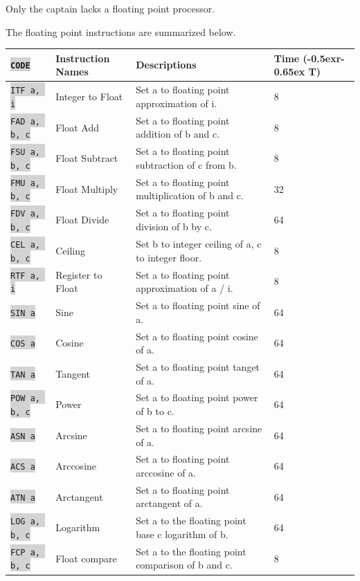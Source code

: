 \documentclass{article}
\newcommand{\vnscode}[1]{\colorbox{lightgray}{\lstinline[language=vns]{#1}}}
\newcommand{\RT}{\lower-0.5ex\hbox{r}\kern-0.65ex T}
\begin{document}
Only the captain lacks a floating point processor.

The floating point instructions are summarized below.

\begin{minipage}{\textwidth}
\label{table:float}
\centering
\begin{tabular}{llll}
    \hline \vnscode{CODE} & Instruction Names & Descriptions & Time (\RT) \\ \hline
    \vnscode{ITF a, i} & Integer to Float & Set a to floating point approximation of i. & 8 \\
    \vnscode{FAD a, b, c} & Float Add & Set a to floating point addition of b and c. & 8 \\
    \vnscode{FSU a, b, c} & Float Subtract & Set a to floating point subtraction of c from b. & 8 \\
    \vnscode{FMU a, b, c} & Float Multiply & Set a to floating point multiplication of b and c. & 32 \\
    \vnscode{FDV a, b, c} & Float Divide & Set a to floating point division of b by c. & 64 \\
    \vnscode{CEL a, b, c} & Ceiling & Set b to integer ceiling of a, c to integer floor. & 8 \\
    \vnscode{RTF a, i} & Register to Float & Set a to floating point approximation of a / i. & 8 \\
    \vnscode{SIN a} & Sine & Set a to floating point sine of a. & 64 \\
    \vnscode{COS a} & Cosine & Set a to floating point cosine of a. & 64 \\
    \vnscode{TAN a} & Tangent & Set a to floating point tanget of a. & 64 \\
    \vnscode{POW a, b, c} & Power & Set a to floating point power of b to c. & 64 \\
    \vnscode{ASN a} & Arcsine & Set a to floating point arcsine of a. & 64 \\
    \vnscode{ACS a} & Arccosine & Set a to floating point arccosine of a. & 64 \\
    \vnscode{ATN a} & Arctangent & Set a to floating point arctangent of a. & 64 \\
    \vnscode{LOG a, b, c} & Logarithm & Set a to the floating point base c logarithm of b. & 64 \\
    \vnscode{FCP a, b, c} & Float compare & Set a to the floating point comparison of b and c. & 8 \\
\end{tabular}
\end{minipage}
\end{document}
